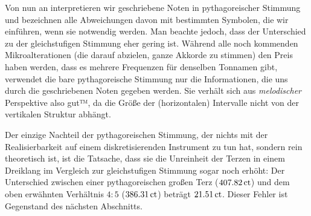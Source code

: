 \documentclass[ngerman,11pt]{scrartcl}
\begin{document}
Von nun an interpretieren wir geschriebene Noten in pythagoreischer
Stimmung und bezeichnen alle Abweichungen davon mit bestimmten Symbolen, die
wir einführen, wenn sie notwendig werden. Man beachte jedoch, dass der
Unterschied zu der gleichstufigen Stimmung eher gering ist.
Während alle noch kommenden Mikroalterationen (die darauf abzielen, ganze
Akkorde zu stimmen) den Preis haben werden, dass es mehrere Frequenzen für
denselben Tonnamen gibt, verwendet die bare pythagoreische Stimmung nur die
Informationen, die uns durch die geschriebenen Noten gegeben werden. Sie verhält
sich aus \emph{melodischer} Perspektive also gut™, da die Größe der 
(horizontalen) Intervalle nicht von der vertikalen Struktur abhängt.

Der einzige Nachteil der pythagoreischen Stimmung, der nichts mit der
Realisierbarkeit auf einem diskretisierenden Instrument zu tun hat, sondern rein
theoretisch ist, ist die Tatsache, dass sie die Unreinheit der Terzen in einem
Dreiklang im Vergleich zur gleichstufigen Stimmung sogar noch erhöht: Der
Unterschied zwischen einer pythagoreischen großen Terz ($407.82\,\mathrm{ct}$) und
dem oben erwähnten Verhältnis $4:5$ ($386.31\,\mathrm{ct}$) beträgt
$21.51\,\mathrm{ct}$. Dieser Fehler ist Gegenstand des nächsten Abschnitts.

\end{document}
